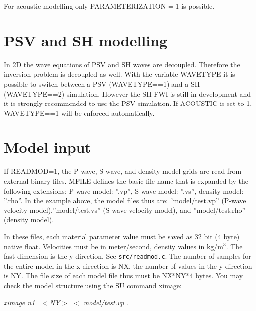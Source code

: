 For acoustic modelling only PARAMETERIZATION = 1 is possible.

\section{PSV and SH modelling}
{\color{blue}{\begin{verbatim}
			"WAVETYPE" : "1",
\end{verbatim}}}

{\color{red}{\begin{verbatim}
Default value is:
	WAVETYPE=1
\end{verbatim}}}
In 2D the wave equations of PSV and SH waves are decoupled. Therefore the inversion problem is decoupled as well. With the variable WAVETYPE it is possible to switch between a PSV (WAVETYPE==1) and a SH (WAVETYPE==2) simulation. However the SH FWI is still in development and it is strongly recommended to use the PSV simulation. If ACOUSTIC is set to 1, WAVETYPE==1 will be enforced automatically.

\section{Model input}
\label{gen_of_mod}
{\color{blue}{\begin{verbatim}
"Model" : "comment",
			"READMOD" : "0",
			"MFILE" : "model/test",
\end{verbatim}}}

If READMOD=1, the P-wave, S-wave, and density model grids are read from external binary files. MFILE defines the basic file name that is expanded by the following extensions: P-wave model: ''.vp'', S-wave model: ''.vs'', density model: ''.rho''.  In the example above, the model files thus are: ''model/test.vp'' (P-wave velocity model),''model/test.vs'' (S-wave velocity model), and ''model/test.rho'' (density model). 

In these files, each material parameter value must be saved as 32 bit (4 byte) native float. Velocities must be in meter/second, density values in kg/m$^3$. The fast dimension is the y direction. See \texttt{src/readmod.c}. The number of samples for the entire model in the x-direction is NX, the number of values in the y-direction is NY. The file size of each model file thus must be NX*NY*4 bytes. You may check the model structure using the SU command ximage:
\newline

\textit{ximage n1=$<$NY$>$ $<$ model/test.vp} .
\newline

